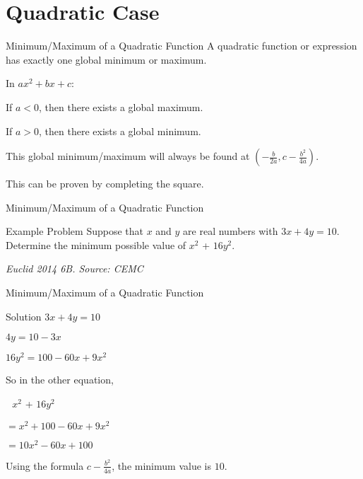\section{Quadratic Case}
\begin{namedframe}{Minimum/Maximum of a Quadratic Function}
	A quadratic function or expression has exactly one global minimum or maximum.

	In $ax^2 + bx + c$:

	If $a < 0$, then there exists a global maximum.

	If $a > 0$, then there exists a global minimum.

	This global minimum/maximum will always be found at $(-\frac{b}{2a}, c - \frac{b^2}{4a})$.

	This can be proven by completing the square.
\end{namedframe}

\begin{namedframe}{Minimum/Maximum of a Quadratic Function}
	\begin{exampleblock}{Example Problem}
		Suppose that $x$ and $y$ are real numbers with $3x + 4y = 10$. Determine the minimum possible value of $x^2$ + $16y^2$.
	\end{exampleblock}
	\textit{Euclid 2014 6B. Source: CEMC}
\end{namedframe}

\begin{namedframe}{Minimum/Maximum of a Quadratic Function}
	\begin{block}{Solution}
		$3x + 4y = 10$

		$4y = 10 - 3x$

		$16y^2 = 100 - 60x + 9x^2$

		\phantom{ }

		So in the other equation,

		$\ \ \ x^2$ + $16y^2$

		$ = x^2 + 100 - 60x + 9x^2$

		$ = 10x^2 - 60x + 100$

		Using the formula $c - \frac{b^2}{4a}$, the minimum value is $10$.
	\end{block}
\end{namedframe}
